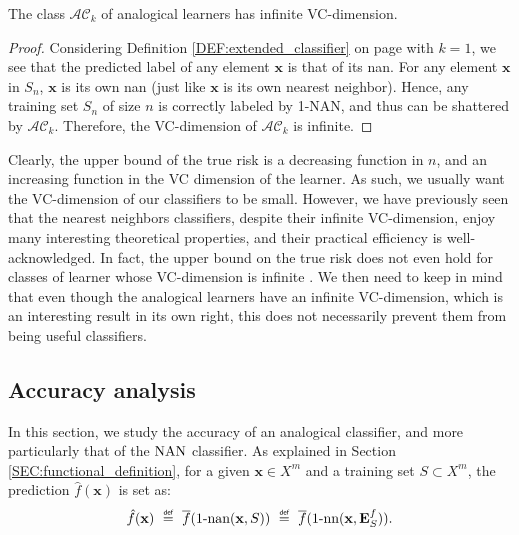 \begin{proposition}
  \label{PROPOS:VCdim}
  The class $\mathcal{AC}_k$ of analogical learners has infinite VC-dimension.
\end{proposition}
\begin{proof}
  Considering Definition \ref{DEF:extended_classifier} on page
  \pageref{DEF:extended_classifier} with $k = 1$, we see
  that the predicted label of any element $\mathbf{x}$ is that of its nan. For
  any element $\mathbf{x}$ in $S_n$, $\mathbf{x}$ is its own nan (just like
  $\mathbf{x}$ is its own nearest neighbor). Hence, any training set $S_n$ of
  size $n$ is correctly labeled by 1-NAN, and thus can be shattered by
  $\mathcal{AC}_k$. Therefore, the VC-dimension of $\mathcal{AC}_k$ is infinite.
\end{proof}

Clearly, the upper bound of the true risk is a decreasing function in $n$, and an increasing
function in the VC dimension of the learner. As such, we usually want the
VC-dimension of our classifiers to be small. However, we have previously seen
that the nearest neighbors classifiers, despite their infinite
VC-dimension, enjoy many interesting theoretical properties, and their
practical efficiency is well-acknowledged. In fact, the upper bound on the true
risk does not even hold for classes of learner whose VC-dimension is infinite
\cite{Bur98}. We then need to keep in mind that even though the analogical
learners have an infinite VC-dimension, which is an interesting result in its
own right, this does not necessarily prevent them from being useful
classifiers.

\subsection{Accuracy analysis}
\label{SEC:accuracy_analysis}

In this section, we study the accuracy of an analogical classifier, and more
particularly that of the $\mbox{NAN}$ classifier. As explained in Section
\ref{SEC:functional_definition}, for a given $\mathbf{x} \in X^m$ and a
training set $S \subset X^m$, the prediction $\hat{f}(\mathbf{x})$ is set as:
$$
\hat{f}(\mathbf{x}) ~ \eqdef ~ \albl{\nan(\mathbf{x}, S)} ~ \eqdef ~ \albl{\nn(\mathbf{x}, \esf)}.
$$

